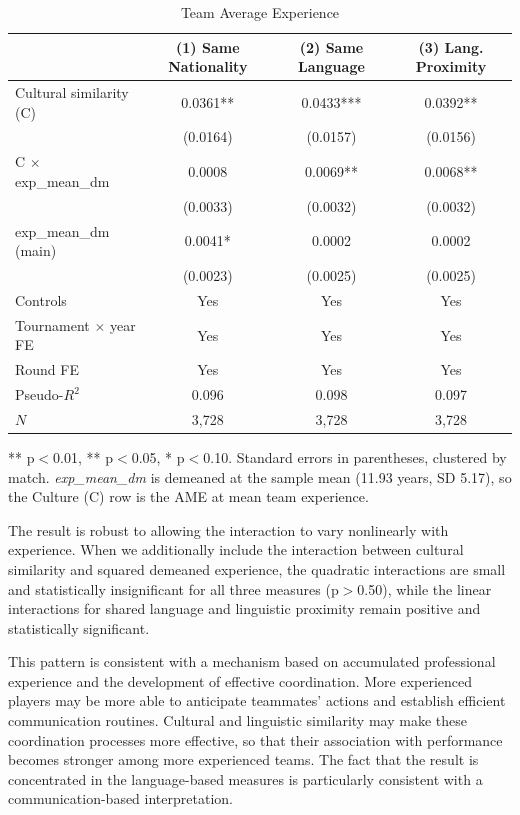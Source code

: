 \documentclass[10pt]{article}
\begin{document}
\begin{table}[htbp]
\color{red}
\centering
\caption{Team Average Experience \label{tab:t6}}
\begin{threeparttable}
\begin{tabular}{lccc}
\toprule
 & (1) Same Nationality & (2) Same Language & (3) Lang. Proximity \\
\midrule
Cultural similarity (C)  & 0.0361** & 0.0433*** & 0.0392** \\
 & (0.0164) & (0.0157) & (0.0156) \\
C $\times$ exp\_mean\_dm & 0.0008 & 0.0069** & 0.0068** \\
 & (0.0033) & (0.0032) & (0.0032) \\
exp\_mean\_dm (main) & 0.0041* & 0.0002 & 0.0002 \\
 & (0.0023) & (0.0025) & (0.0025) \\
\midrule
Controls & Yes & Yes & Yes \\
Tournament $\times$ year FE & Yes & Yes & Yes \\
Round FE & Yes & Yes & Yes \\
Pseudo-$R^2$ & 0.096 & 0.098 & 0.097 \\
$N$ & 3,728 & 3,728 & 3,728 \\
\bottomrule
\end{tabular}
\begin{tablenotes}
\small
\item *** p$<$0.01, ** p$<$0.05, * p$<$0.10. Standard errors in parentheses, clustered by match. \textit{exp\_mean\_dm} is demeaned at the sample mean (11.93 years, SD 5.17), so the Culture (C) row is the AME at mean team experience.
\end{tablenotes}
\end{threeparttable}
\end{table}
\FloatBarrier



The result is robust to allowing the interaction to vary nonlinearly with experience. When we additionally include the interaction between cultural similarity and squared demeaned experience, the quadratic interactions are small and statistically insignificant for all three measures (p$>$0.50), while the linear interactions for shared language and linguistic proximity remain positive and statistically significant. %

This pattern is consistent with a mechanism based on accumulated professional experience and the development of effective coordination. More experienced players may be more able to anticipate teammates' actions and establish efficient communication routines. Cultural and linguistic similarity may make these coordination processes more effective, so that their association with performance becomes stronger among more experienced teams. The fact that the result is concentrated in the language-based measures is particularly consistent with a communication-based interpretation.
\end{document}
